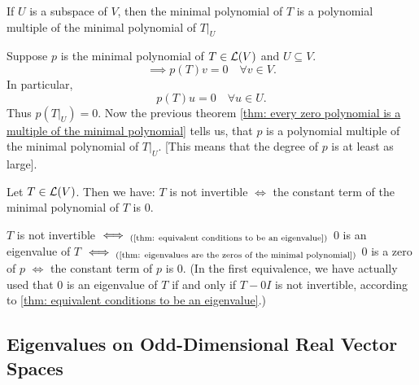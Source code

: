 \setcounter{thm}{30}
\begin{thm}
  \label{thm: minimal polynomial of a restriction operator}
  If $U$ is a subspace of $V$, then the minimal polynomial of $T$ is a polynomial multiple of the minimal polynomial of $\left .T \right | _{ U}$
\end{thm}
\begin{prf}
  Suppose $p$ is the minimal polynomial of $T\in \mathcal{L}(V)$ and $U \subseteq V$.
  \begin{equation}
    \implies p(T)v=0 \quad \forall v \in V.
  \end{equation}
  In particular,
  \begin{equation}
    p(T)u=0 \quad \forall u\in U.
  \end{equation} Thus $p\left( \left.T\right|_{U} \right)=0.$ Now the previous theorem
  \ref{thm: every zero polynomial is a multiple of the minimal polynomial} tells us, that $p$ is a polynomial multiple of the minimal polynomial of $\left. T \right |_U$. [This means that the degree of $p$ is at least as large].
\end{prf}

\begin{thm} 
  Let $T \in \mathcal{L} (V)$. Then we have: $T$ is not invertible $\iff$ the constant term of the minimal polynomial of $T$ is $0$.
\end{thm}
\begin{prf}
  $T$ is not invertible $\iff_{\text{(\ref{thm: equivalent conditions to be an eigenvalue})}}$ $0$ is an eigenvalue of $T$ $\iff_{(\text{\ref{thm: eigenvalues are the zeros of the minimal polynomial})}}$ $0$ is a zero of $p$ $\iff$ the constant term of $p$ is $0$.
  (In the first equivalence, we have actually used that $0$ is an eigenvalue of $T$ if and only if $T-0I$ is not invertible, according to \ref{thm: equivalent conditions to be an eigenvalue}.)
\end{prf}

\subsection{Eigenvalues on Odd-Dimensional Real Vector Spaces}

